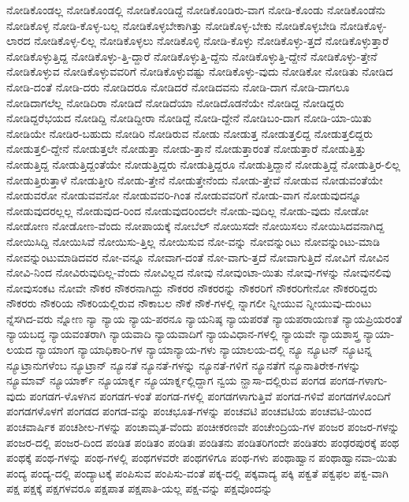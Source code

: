 {ನೋಡಿಕೊಂಡಲ್ಲ
ನೋಡಿಕೊಂಡಲ್ಲಿ
ನೋಡಿಕೊಂಡಿದ್ದೆ
ನೋಡಿಕೊಂಡಿರು-ವಾಗ
ನೋಡಿ-ಕೊಂಡು
ನೋಡಿಕೊಂಡೆನು
ನೋಡಿಕೊಳ್ಳ
ನೋಡಿ-ಕೊಳ್ಳ-ಬಲ್ಲ
ನೋಡಿಕೊಳ್ಳಬೇಕಾಗಿತ್ತು
ನೋಡಿಕೊಳ್ಳ-ಬೇಕು
ನೋಡಿಕೊಳ್ಳಬೇಡಿ
ನೋಡಿಕೊಳ್ಳ-ಲಾರದ
ನೋಡಿಕೊಳ್ಳ-ಲಿಲ್ಲ
ನೋಡಿಕೊಳ್ಳಲು
ನೋಡಿಕೊಳ್ಳಿ
ನೋಡಿ-ಕೊಳ್ಳು
ನೋಡಿಕೊಳ್ಳು-ತ್ತದೆ
ನೋಡಿಕೊಳ್ಳುತ್ತಾರೆ
ನೋಡಿಕೊಳ್ಳುತ್ತಿದ್ದ
ನೋಡಿಕೊಳ್ಳು-ತ್ತಿ-ದ್ದಾರೆ
ನೋಡಿಕೊಳ್ಳುತ್ತಿ-ದ್ದೆನು
ನೋಡಿಕೊಳ್ಳುತ್ತಿ-ದ್ದೇನೆ
ನೋಡಿಕೊಳ್ಳು-ತ್ತೇನೆ
ನೋಡಿಕೊಳ್ಳುವ
ನೋಡಿಕೊಳ್ಳುವವರಿಗೆ
ನೋಡಿಕೊಳ್ಳುವಷ್ಟು
ನೋಡಿಕೊಳ್ಳು-ವುದು
ನೋಡಿಕೋ
ನೋಡಿತು
ನೋಡಿದ
ನೋಡಿ-ದಂತೆ
ನೋಡಿ-ದರು
ನೋಡಿದರೂ
ನೋಡಿದರೆ
ನೋಡಿದವನು
ನೋಡಿ-ದಾಗ
ನೋಡಿ-ದಾಗಲೂ
ನೋಡಿದಾಗಲೆಲ್ಲ
ನೋಡಿದಿರಾ
ನೋಡಿದೆ
ನೋಡಿದೆಯಾ
ನೋಡಿದೊಡನೆಯೇ
ನೋಡಿದ್ದ
ನೋಡಿದ್ದರು
ನೋಡಿದ್ದರೆಭಯದ
ನೋಡಿದ್ದಿ
ನೋಡಿದ್ದೀರಾ
ನೋಡಿದ್ದೆ
ನೋಡಿ-ದ್ದೇನೆ
ನೋಡಿಬಂ-ದಾಗ
ನೋಡಿ-ಯಾ-ಯಿತು
ನೋಡಿಯೇ
ನೋಡಿರ-ಬಹುದು
ನೋಡಿರಿ
ನೋಡಿರುವ
ನೋಡು
ನೋಡುತ್ತ
ನೋಡುತ್ತಲಿದ್ದ
ನೋಡುತ್ತಲಿದ್ದರು
ನೋಡುತ್ತಲಿ-ದ್ದೇನೆ
ನೋಡುತ್ತಲೇ
ನೋಡುತ್ತಾ
ನೋಡು-ತ್ತಾನೆ
ನೋಡುತ್ತಾರಂತೆ
ನೋಡುತ್ತಾರೆ
ನೋಡುತ್ತಿತ್ತು
ನೋಡುತ್ತಿದ್ದ
ನೋಡುತ್ತಿದ್ದಂತೆಯೇ
ನೋಡುತ್ತಿದ್ದರು
ನೋಡುತ್ತಿದ್ದರೂ
ನೋಡುತ್ತಿದ್ದಾನೆ
ನೋಡುತ್ತಿದ್ದೆ
ನೋಡುತ್ತಿರ-ಲಿಲ್ಲ
ನೋಡುತ್ತಿರುತ್ತಾಳೆ
ನೋಡುತ್ತೀರಿ
ನೋಡು-ತ್ತೇನೆ
ನೋಡುತ್ತೇನೆಂದು
ನೋಡು-ತ್ತೇವೆ
ನೋಡುವ
ನೋಡುವಂತೆಯೇ
ನೋಡುವರೋ
ನೋಡುವವನೋ
ನೋಡುವವರಿ-ಗಿಂತ
ನೋಡುವವರಿಗೆ
ನೋಡು-ವಾಗ
ನೋಡುವುದನ್ನೂ
ನೋಡುವುದರಲ್ಲಲ್ಲ
ನೋಡುವುದ-ರಿಂದ
ನೋಡುವುದರಿಂದಲೇ
ನೋಡು-ವುದಿಲ್ಲ
ನೋಡು-ವುದು
ನೋಡೋ
ನೋಡೋಣ
ನೋಡೋಣ-ವೆಂದು
ನೋಪಾಯಕ್ಕೆ
ನೋಬೆಲ್
ನೋಯಿಸದೇ
ನೋಯಿಸಲು
ನೋಯಿಸಿದವನಾಗಿದ್ದ
ನೋಯಿಸಿದ್ದಿ
ನೋಯಿಸಿವೆ
ನೋಯಿಸು-ತ್ತಿಲ್ಲ
ನೋಯಿಸುವ
ನೋ-ವನ್ನು
ನೋವನ್ನುಂಟು
ನೋವನ್ನುಂಟು-ಮಾಡಿ
ನೋವನ್ನುಂಟುಮಾಡಿದವರ
ನೋ-ವನ್ನೂ
ನೋವಾಗ-ದಂತೆ
ನೋ-ವಾಗು-ತ್ತದೆ
ನೋವಾಗುತ್ತಿದೆ
ನೋವಿಗೆ
ನೋವಿನ
ನೋವಿ-ನಿಂದ
ನೋವಿರುವುದಿಲ್ಲ-ವೆಂದು
ನೋವಿಲ್ಲದ
ನೋವು
ನೋವುಂಟಾ-ಯಿತು
ನೋವು-ಗಳನ್ನು
ನೋವುನಲಿವು
ನೋವುಸಂಕಟ
ನೋವೇ
ನೌಕರ
ನೌಕರನಾಗಿದ್ದು
ನೌಕರರ
ನೌಕರರನ್ನು
ನೌಕರರಿಗೆ
ನೌಕರರಿಗೇನೋ
ನೌಕರರಿದ್ದರು
ನೌಕರರು
ನೌಕರಿಯ
ನೌಕರಿಯಲ್ಲಿರುವ
ನೌಕಾಬಲ
ನೌಕೆ
ನೌಕೆ-ಗಳಲ್ಲಿ
ನ್ನಾಗಲೀ
ನ್ನೀಯುವ
ನ್ನೀಯುವು-ದುಂಟು
ನ್ನೆಸಗಿದ-ವರು
ನ್ನೋಣ
ನ್ಯಾ
ನ್ಯಾಯ
ನ್ಯಾಯ-ಪರನೂ
ನ್ಯಾಯನಿಷ್ಠ
ನ್ಯಾಯಪರತೆ
ನ್ಯಾಯಪರಾಯಣತೆ
ನ್ಯಾಯಪ್ರಿಯರಂತೆ
ನ್ಯಾಯಬದ್ಧ
ನ್ಯಾಯವಂತರಾಗಿ
ನ್ಯಾಯವಾದಿ
ನ್ಯಾಯವಾದಿಗೆ
ನ್ಯಾಯವಿಧಾನ-ಗಳಲ್ಲಿ
ನ್ಯಾಯವೇ
ನ್ಯಾಯಶಾಸ್ತ್ರ
ನ್ಯಾಯಾ-ಲಯದ
ನ್ಯಾಯಾಂಗ
ನ್ಯಾಯಾಧಿಕಾರಿ-ಗಳ
ನ್ಯಾಯಾನ್ಯಾಯ-ಗಳು
ನ್ಯಾಯಾಲಯ-ದಲ್ಲಿ
ನ್ಯೂ
ನ್ಯೂಟನ್
ನ್ಯೂಟನ್ನ
ನ್ಯೂಟ್ರಾನುಗಳೆಂಬ
ನ್ಯೂಟ್ರಾನ್
ನ್ಯೂನತೆ
ನ್ಯೂನತೆ-ಗಳನ್ನು
ನ್ಯೂನತೆ-ಗಳಿಗೆ
ನ್ಯೂನತೆಗೆ
ನ್ಯೂನಾತಿರೇಕ-ಗಳನ್ನು
ನ್ಯೂಮಾವ್
ನ್ಯೂಯಾರ್ಕ್
ನ್ಯೂಯಾರ್ಕ್ನ
ನ್ಯೂಯಾರ್ಕ್ನಲ್ಲಿದ್ದಾಗ
ನ್ವಯ
ನ್ಹಾಸಾ-ದಲ್ಲಿರುವ
ಪಂಗಡ
ಪಂಗಡ-ಗಳಾಗು-ವುದು
ಪಂಗಡಗ-ಳೊಳಗಿನ
ಪಂಗಡಗ-ಳಂತೆ
ಪಂಗಡ-ಗಳಲ್ಲಿ
ಪಂಗಡಗಳಾಗುತ್ತಿವೆ
ಪಂಗಡ-ಗಳಿವೆ
ಪಂಗಡಗಳೊಂದಿಗೆ
ಪಂಗಡಗಳೊಳಗೆ
ಪಂಗಡದ
ಪಂಗಡ-ವನ್ನು
ಪಂಚಭೂತ-ಗಳನ್ನು
ಪಂಚವಟಿ
ಪಂಚವಟಿಯ
ಪಂಚವಟಿ-ಯಿಂದ
ಪಂಚವಾರ್ಷಿಕ
ಪಂಚಶೀಲ-ಗಳನ್ನು
ಪಂಚಾಮೃತ-ವೆಂದು
ಪಂಚೀಕರಣವೇ
ಪಂಚೇಂದ್ರಿಯ-ಗಳ
ಪಂಜರ
ಪಂಜರ-ಗಳನ್ನು
ಪಂಜರ-ದಲ್ಲಿ
ಪಂಜರ-ದಿಂದ
ಪಂಡಿತ
ಪಂಡಿತಂ
ಪಂಡಿತಃ
ಪಂಡಿತನು
ಪಂಡಿತರಿಗಂದೇ
ಪಂಡಿತರು
ಪಂಢರಪುರಕ್ಕೆ
ಪಂಥ
ಪಂಥಕ್ಕೆ
ಪಂಥ-ಗಳನ್ನು
ಪಂಥ-ಗಳಲ್ಲಿ
ಪಂಥಗಳವರೇ
ಪಂಥಗಳಿಗೂ
ಪಂಥ-ಗಳು
ಪಂಥಾಹ್ವಾನ
ಪಂಥಾಹ್ವಾನವಾ-ಯಿತು
ಪಂದ್ಯ
ಪಂದ್ಯ-ದಲ್ಲಿ
ಪಂದ್ಯಾಟಕ್ಕೆ
ಪಂಪಿಸುವ
ಪಂಪಿಸು-ವಂತೆ
ಪಕ್ಕ-ದಲ್ಲಿ
ಪಕ್ಕವಾದ್ಯ
ಪಕ್ಕಿ
ಪಕ್ವತೆ
ಪಕ್ವಫಲ
ಪಕ್ವ-ವಾಗಿ
ಪಕ್ಷ
ಪಕ್ಷಕ್ಕೆ
ಪಕ್ಷಗಳವರೂ
ಪಕ್ಷಪಾತ
ಪಕ್ಷಪಾತಿ-ಯಲ್ಲ
ಪಕ್ಷ-ವನ್ನು
ಪಕ್ಷವೊಂದನ್ನು
}
